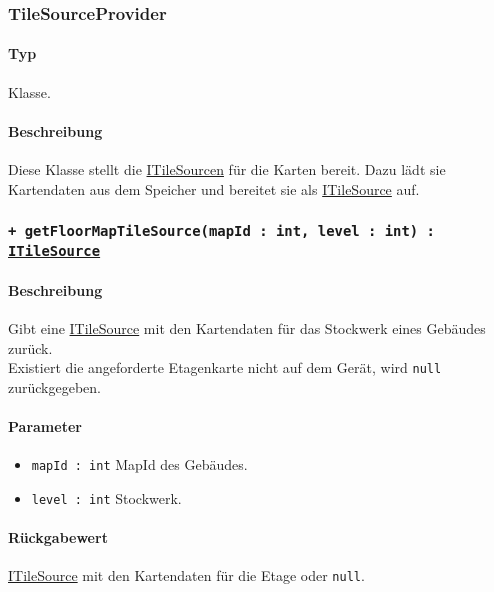 \subsubsection{TileSourceProvider}
\paragraph*{Typ}
Klasse.
\paragraph*{Beschreibung}
Diese Klasse stellt die \href{https://osmdroid.github.io/osmdroid/javadocAll/org/osmdroid/tileprovider/tilesource/ITileSource.html}
{ITileSourcen} für die Karten bereit. Dazu lädt sie Kartendaten aus dem Speicher und bereitet sie als 
\href{https://osmdroid.github.io/osmdroid/javadocAll/org/osmdroid/tileprovider/tilesource/ITileSource.html}
{ITileSource} auf.

\subsubsection*{\texttt{+ getFloorMapTileSource(mapId : int, level : int) : \href{https://osmdroid.github.io/osmdroid/javadocAll/org/osmdroid/tileprovider/tilesource/ITileSource.html}
{ITileSource}}}%
\paragraph*{Beschreibung}
Gibt eine \href{https://osmdroid.github.io/osmdroid/javadocAll/org/osmdroid/tileprovider/tilesource/ITileSource.html}
{ITileSource} mit den Kartendaten für das Stockwerk eines Gebäudes zurück.\\
Existiert die angeforderte Etagenkarte nicht auf dem Gerät, wird \texttt{null} zurückgegeben.
\paragraph*{Parameter}
\begin{itemize}
    \item \texttt{mapId : int} MapId des Gebäudes.
    \item \texttt{level : int} Stockwerk.
\end{itemize}
\paragraph*{Rückgabewert}
\href{https://osmdroid.github.io/osmdroid/javadocAll/org/osmdroid/tileprovider/tilesource/ITileSource.html}
{ITileSource} mit den Kartendaten für die Etage oder \texttt{null}.

